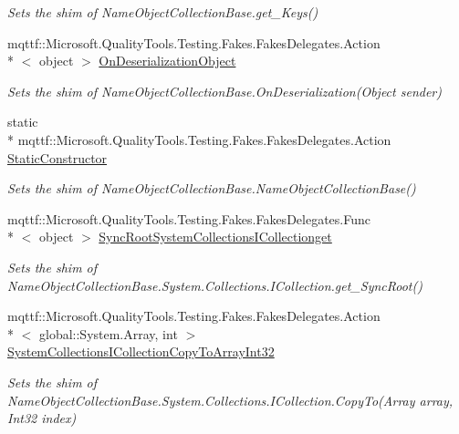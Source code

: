 \begin{DoxyCompactItemize}
\begin{DoxyCompactList}\small\item\em Sets the shim of Name\-Object\-Collection\-Base.\-get\-\_\-\-Keys()\end{DoxyCompactList}\item 
mqttf\-::\-Microsoft.\-Quality\-Tools.\-Testing.\-Fakes.\-Fakes\-Delegates.\-Action\\*
$<$ object $>$ \hyperlink{class_system_1_1_collections_1_1_specialized_1_1_fakes_1_1_shim_name_object_collection_base_a3b5762b727346171b203a09c5d5d450c}{On\-Deserialization\-Object}
\begin{DoxyCompactList}\small\item\em Sets the shim of Name\-Object\-Collection\-Base.\-On\-Deserialization(\-Object sender)\end{DoxyCompactList}\item 
static \\*
mqttf\-::\-Microsoft.\-Quality\-Tools.\-Testing.\-Fakes.\-Fakes\-Delegates.\-Action \hyperlink{class_system_1_1_collections_1_1_specialized_1_1_fakes_1_1_shim_name_object_collection_base_a1821e1f3880af172e4ec42ca9d42b83c}{Static\-Constructor}
\begin{DoxyCompactList}\small\item\em Sets the shim of Name\-Object\-Collection\-Base.\-Name\-Object\-Collection\-Base()\end{DoxyCompactList}\item 
mqttf\-::\-Microsoft.\-Quality\-Tools.\-Testing.\-Fakes.\-Fakes\-Delegates.\-Func\\*
$<$ object $>$ \hyperlink{class_system_1_1_collections_1_1_specialized_1_1_fakes_1_1_shim_name_object_collection_base_aa54f963c59027cdbd461048eb4f59bd3}{Sync\-Root\-System\-Collections\-I\-Collectionget}
\begin{DoxyCompactList}\small\item\em Sets the shim of Name\-Object\-Collection\-Base.\-System.\-Collections.\-I\-Collection.\-get\-\_\-\-Sync\-Root()\end{DoxyCompactList}\item 
mqttf\-::\-Microsoft.\-Quality\-Tools.\-Testing.\-Fakes.\-Fakes\-Delegates.\-Action\\*
$<$ global\-::\-System.\-Array, int $>$ \hyperlink{class_system_1_1_collections_1_1_specialized_1_1_fakes_1_1_shim_name_object_collection_base_af9eec00abf5cee59fa58b2fb2455fe5c}{System\-Collections\-I\-Collection\-Copy\-To\-Array\-Int32}
\begin{DoxyCompactList}\small\item\em Sets the shim of Name\-Object\-Collection\-Base.\-System.\-Collections.\-I\-Collection.\-Copy\-To(\-Array array, Int32 index)\end{DoxyCompactList}\end{DoxyCompactItemize}


